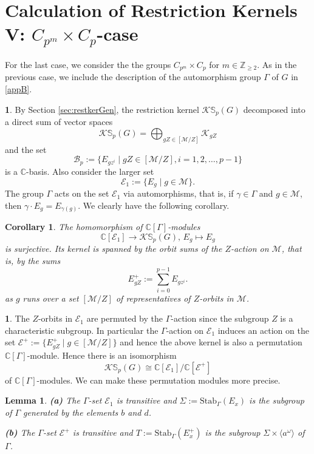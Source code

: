\documentclass[12pt]{article}
\theoremstyle{plain}
\newtheorem{corollary}[theorem]{Corollary}
\newtheorem{lemma}[theorem]{Lemma}
\theoremstyle{definition}
\newtheorem{nothing}[theorem]{}
\newcommand{\kerlin}{\mathbb S_p}
\begin{document}
\section{Calculation of Restriction Kernels V: $C_{p^m}\times C_p$-case}\label{sec:restker32}

For the last case, we consider the the groups $C_{p^m}\times C_p$ for $m\in\mathbb Z_{\ge 2}$. As in the previous case, we include the description of the automorphism group $\Gamma$ of $G$ in  \ref{appB}. 

\begin{nothing} By Section \ref{sec:restkerGen}, the restriction kernel $\mathcal{K}\kerlin(G)$ decomposed into a direct sum of vector spaces
\[
\mathcal K\kerlin(G) = \bigoplus_{gZ\in [\mathcal M/Z]} \mathcal K_{gZ}
\]
and the set 
\[
\mathcal B_p:=\big\{ E_{gz^i} \mid gZ\in [\mathcal M/Z], i=1, 2, \ldots, p-1\big\}
\]
is a $\mathbb C$-basis. Also consider the larger set
\[
\mathcal E_1:=\big\{ E_{g} \mid g\in\mathcal{M} \big\}.
\]
The group $\Gamma$ acts on the set $\mathcal E_1$ via automorphisms, that is, if $\gamma\in\Gamma$ and $g\in\mathcal{M}$, then $\gamma\cdot E_g = E_{\gamma(g)}$. We clearly have the following corollary.
\end{nothing}
\begin{corollary}
    The homomorphism of $\mathbb C[\Gamma]$-modules
    \[
    \mathbb C[\mathcal{E}_1] \to \mathcal{K}\kerlin(G), \, E_g\mapsto E_g
    \]
    is surjective. Its kernel is spanned by the orbit sums of the $Z$-action on $\mathcal M$, that is, by the sums
    \[
    E^+_{gZ} := \sum_{i=0}^{p-1}E_{gz^i}.
    \]
    as $g$ runs over a set $[\mathcal{M}/Z]$ of representatives of $Z$-orbits in $\mathcal M$.
\end{corollary}
\begin{nothing}
     The $Z$-orbits in $\mathcal{E}_1$ are permuted by the $\Gamma$-action since the subgroup $Z$ is a characteristic subgroup. In particular the $\Gamma$-action on $\mathcal{E}_1$ induces an action on the set $\mathcal{E}^+:=\{ E_{gZ}^+\mid g \in [\mathcal{M}/Z] \}$ and hence the above kernel is also a permutation $\mathbb C[\Gamma]$-module. Hence there is an isomorphism
    \[
    \mathcal{K}\kerlin(G) \cong \mathbb C[\mathcal{E}_1]/ \mathbb C[\mathcal{E}^+]
    \]
    of $\mathbb C[\Gamma]$-modules. We can make these permutation modules more precise.
\end{nothing}
\begin{lemma}
  \textrm{\textbf{(a)}}  The $\Gamma$-set $\mathcal{E}_1$ is transitive and $\Sigma:=\text{Stab}_\Gamma(E_x)$ is the subgroup of $\Gamma$ generated by the elements $b$ and $d$.

  \smallskip

  \textbf{(b)} The $\Gamma$-set $\mathcal{E}^+$ is transitive and $T:=\text{Stab}_\Gamma(E_x^+)$ is the subgroup $\Sigma\times \langle a^\omega\rangle$ of $\Gamma$.
\end{lemma}
\end{document}
